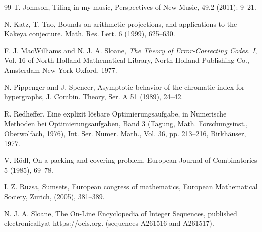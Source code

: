 \documentclass[12pt]{amsart}
\theoremstyle{plain}
\numberwithin{equation}{section}
\begin{document}
\begin{thebibliography}{99}
	 T. Johnson, Tiling in my music, Perspectives of New Music, 49.2 (2011): 9--21.
	
	 N. Katz, T. Tao, Bounds on arithmetic projections, and applications to the Kakeya conjecture. Math. Res. Lett. 6 (1999), 625--630.
	
	F. J. MacWilliams and N. J. A. Sloane, {\em The Theory of Error-Correcting Codes. {I}}, Vol. 16 of North-Holland Mathematical Library, North-Holland Publishing Co., Amsterdam-New York-Oxford, 1977.
	

N. Pippenger and J. Spencer, Asymptotic behavior of the chromatic 
index for hypergraphs, J. Combin. Theory, Ser. A 51 (1989), 24--42.
	
	 R. Redheffer, Eine explizit l\"{o}sbare Optimierungsaufgabe, in Numerische Methoden bei Optimierungsaufgaben, Band 3 (Tagung, Math. Forschungsinst., Oberwolfach, 1976), Int. Ser. Numer. Math., Vol. 36, pp. 213--216, Birkh\"{a}user, 1977.

V. R\"odl, On a packing and covering problem, 
European Journal of Combinatorics 5 (1985), 69--78.
	
	 I. Z. Ruzsa, Sumsets, European congress of mathematics, European Mathematical Society, Zurich, (2005), 381--389.
	
	 N. J. A. Sloane, The On-Line Encyclopedia of Integer Sequences, published electronicallyat https://oeis.org. (sequences A261516 and A261517).
	
\end{thebibliography}
\end{document}
